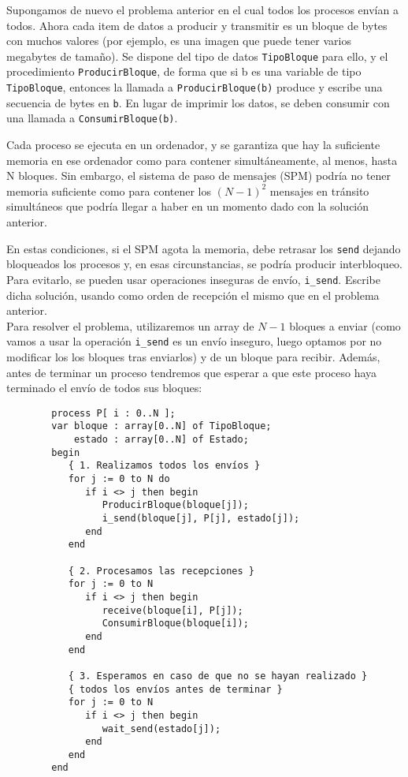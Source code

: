 \begin{ejercicio}\label{ej:rel3_13}
    Supongamos de nuevo el problema anterior en el cual todos los procesos envían a todos. Ahora cada item de datos a producir y transmitir es un bloque de bytes con muchos valores (por ejemplo, es una imagen que puede tener varios megabytes de tamaño). Se dispone del tipo de datos \verb|TipoBloque| para ello, y el procedimiento \verb|ProducirBloque|, de forma que si b es una variable de tipo \verb|TipoBloque|, entonces la llamada a \verb|ProducirBloque(b)| produce y escribe una secuencia de bytes en \verb|b|. En lugar de imprimir los datos, se deben consumir con una llamada a \verb|ConsumirBloque(b)|.

    Cada proceso se ejecuta en un ordenador, y se garantiza que hay la suficiente memoria en ese ordenador como para contener simultáneamente, al menos, hasta N bloques. Sin embargo, el sistema de paso de mensajes (SPM) podría no tener memoria suficiente como para contener los ${(N-1)}^{2}$ mensajes en tránsito simultáneos que podría llegar a haber en un momento dado con la solución anterior.

    En estas condiciones, si el SPM agota la memoria, debe retrasar los \verb|send| dejando bloqueados los procesos y, en esas circunstancias, se podría producir interbloqueo. Para evitarlo, se pueden usar operaciones inseguras de envío, \verb|i_send|. Escribe dicha solución, usando como orden de recepción el mismo que en el problema anterior.\\

    \noindent
    Para resolver el problema, utilizaremos un array de $N-1$ bloques a enviar (como vamos a usar la operación \verb|i_send| es un envío inseguro, luego optamos por no modificar los los bloques tras enviarlos) y de un bloque para recibir. Además, antes de terminar un proceso tendremos que esperar a que este proceso haya terminado el envío de todos sus bloques:
    \begin{verbatim}
        process P[ i : 0..N ];
        var bloque : array[0..N] of TipoBloque;
            estado : array[0..N] of Estado;
        begin
           { 1. Realizamos todos los envíos }
           for j := 0 to N do
              if i <> j then begin
                 ProducirBloque(bloque[j]);
                 i_send(bloque[j], P[j], estado[j]);
              end
           end

           { 2. Procesamos las recepciones }
           for j := 0 to N
              if i <> j then begin
                 receive(bloque[i], P[j]);
                 ConsumirBloque(bloque[i]);
              end
           end

           { 3. Esperamos en caso de que no se hayan realizado }
           { todos los envíos antes de terminar }
           for j := 0 to N
              if i <> j then begin
                 wait_send(estado[j]);
              end
           end
        end
    \end{verbatim}
\end{ejercicio}

